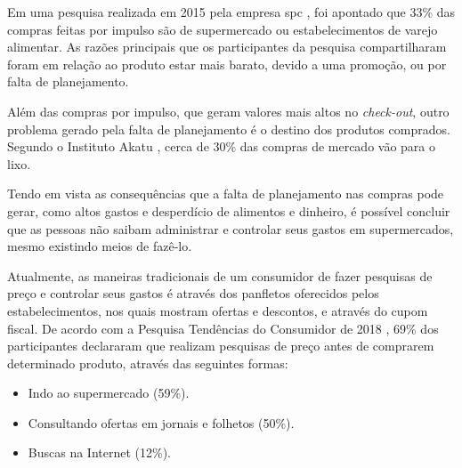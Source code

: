 Em uma pesquisa realizada em 2015 pela empresa \gls{spc} \cite{SPC}, foi apontado que 33\% das compras feitas por impulso são de supermercado ou estabelecimentos de varejo alimentar. As razões principais que os participantes da pesquisa compartilharam foram em relação ao produto estar mais barato, devido a uma promoção, ou por falta de planejamento.

Além das compras por impulso, que geram valores mais altos no \textit{check-out}, outro problema gerado pela falta de planejamento é o destino dos produtos comprados. Segundo o Instituto Akatu \cite{Akatu}, cerca de 30\% das compras de mercado vão para o lixo.

Tendo em vista as consequências que a falta de planejamento nas compras pode gerar, como altos gastos e desperdício de alimentos e dinheiro, é possível concluir que as pessoas não saibam administrar e controlar seus gastos em supermercados, mesmo existindo meios de fazê-lo.

Atualmente, as maneiras tradicionais de um consumidor de fazer pesquisas de preço e controlar seus gastos é através dos panfletos oferecidos pelos estabelecimentos, nos quais mostram ofertas e descontos, e através do cupom fiscal. De acordo com a Pesquisa Tendências do Consumidor de 2018 \cite{PesquisaAPAS}, 69\% dos participantes declararam que realizam pesquisas de preço antes de comprarem determinado produto, através das seguintes formas:
\begin{itemize}
\item Indo ao supermercado (59\%).
\item Consultando ofertas em jornais e folhetos (50\%).
\item Buscas na Internet (12\%).
\end{itemize}


